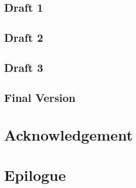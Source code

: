 \documentclass{article}
\begin{document}
\newpage
\begin{center}
\vspace*{\fill}
\LARGE
\subsection{Draft 1}
\vspace*{\fill}
%
\end{center}
\newpage
\begin{center}
\vspace*{\fill}
\LARGE
\subsection{Draft 2}
\vspace*{\fill}
%
\end{center}
\newpage
\begin{center}
\vspace*{\fill}
\LARGE
\subsection{Draft 3}
\vspace*{\fill}
%
\end{center}
\newpage
\begin{center}
\vspace*{\fill}
\LARGE
\subsection{Final Version}
\vspace*{\fill}
%
\end{center}


\section{Acknowledgement}
\section{Epilogue}
\end{document}
